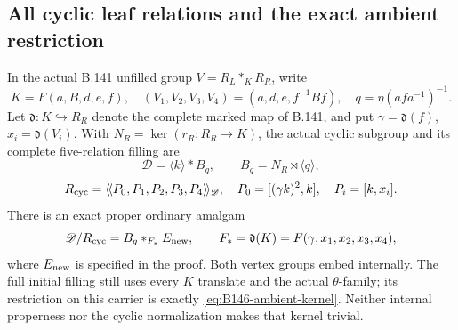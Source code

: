 \subsection*{All cyclic leaf relations and the exact ambient restriction}

\label{stmt:B146}
In the actual B.141 unfilled group $V=R_L*_KR_R$, write
\[
 K=F(a,B,d,e,f),\quad
 (V_1,V_2,V_3,V_4)=(a,d,e,f^{-1}Bf),\quad
 q=\eta(afa^{-1})^{-1}.
\]
Let $\mathfrak d:K\hookrightarrow R_R$ denote the complete marked
map of B.141, and put $\gamma=\mathfrak d(f)$,
$x_i=\mathfrak d(V_i)$. With $N_R=\ker(r_R:R_R\to K)$, the
actual cyclic subgroup and its complete five-relation filling are
\begin{equation}\label{eq:B146-carrier}
 \mathscr D=\langle k\rangle*B_q,\qquad
 B_q=N_R\rtimes\langle q\rangle,
\end{equation}
\begin{equation}\label{eq:B146-five}
 R_{\rm cyc}=\langle\!\langle P_0,P_1,P_2,P_3,P_4
                    \rangle\!\rangle_{\mathscr D},\quad
 P_0=[(\gamma k)^2,k],\quad P_i=[k,x_i].
\end{equation}
There is an exact proper ordinary amalgam
\begin{equation}\label{eq:B146-amalgam}
 \mathscr D/R_{\rm cyc}
       =B_q*_{F_*}E_{\rm new},\qquad
 F_*=\mathfrak d(K)=F(\gamma,x_1,x_2,x_3,x_4),
\end{equation}
where $E_{\rm new}$ is specified in the proof. Both vertex groups
embed internally. The full initial filling still uses every $K$
translate and the actual $\theta$-family; its restriction on this
carrier is exactly \eqref{eq:B146-ambient-kernel}. Neither internal
properness nor the cyclic normalization makes that kernel trivial.

